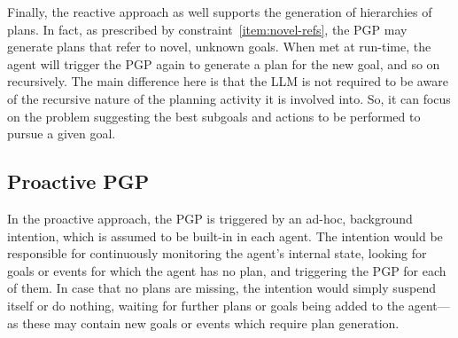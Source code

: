 \documentclass[12pt,a4paper,openright,twoside]{book}
\begin{document}
Finally, the reactive approach as well supports the generation of hierarchies of plans.
%
In fact, as prescribed by constraint~\ref{item:novel-refs}, the \ac{PGP} may generate plans that refer to novel, unknown goals.
%
When met at run-time, the agent will trigger the \ac{PGP} again to generate a plan for the new goal, and so on recursively.
%
The main difference here is that the \ac{LLM} is not required to be aware of the recursive nature of the planning activity it is involved into.
%
So, it can focus on the problem suggesting the best subgoals and actions to be performed to pursue a given goal.

\subsection{Proactive \acs{PGP}}

In the proactive approach, the \ac{PGP} is triggered by an ad-hoc, background intention, which is assumed to be built-in in each agent.
%
The intention would be responsible for continuously monitoring the agent's internal state, looking for goals or events for which the agent has no plan, and triggering the \ac{PGP} for each of them.
%
In case that no plans are missing, the intention would simply suspend itself or do nothing, waiting for further plans or goals being added to the agent---as these may contain new goals or events which require plan generation.
\end{document}
